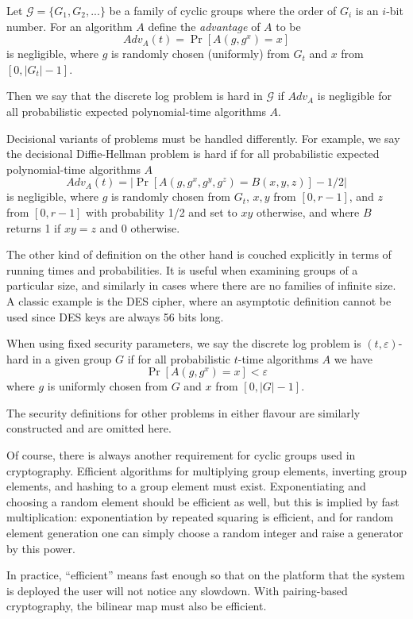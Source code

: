 Let $\mathcal G = \{G_1, G_2, ... \}$ be a family of cyclic groups
where the order of $G_i$ is an $i$-bit number.
For an algorithm $A$
define the \emph{advantage} of $A$ to be
\[
Adv_A(t) = \Pr [ A(g, g^x) = x ]
\]
is negligible,
where $g$ is randomly chosen (uniformly) from $G_t$ and $x$ from
$[0, |G_t|-1]$.

Then we say that
the discrete log problem is hard in $\mathcal G$ if $Adv_A$ is negligible
for all probabilistic expected polynomial-time algorithms $A$.

Decisional variants of problems must be handled differently.
For example, we say the decisional Diffie-Hellman problem is hard if
for all probabilistic expected polynomial-time algorithms $A$
\[
Adv_A(t) = | \Pr [ A(g, g^x, g^y, g^z) = B(x, y, z) ] - 1/2 |
\]
is negligible,
where $g$ is randomly chosen from $G_t$, $x, y$ from $[0,r-1]$, and
$z$ from $[0,r-1]$ with probability 1/2 and set to $x y$ otherwise,
and where $B$ returns 1 if $x y = z$ and 0 otherwise.

The other kind of definition on the other hand is couched explicitly in
terms of running times and probabilities. It is useful when examining
groups of a particular size, and similarly in cases where there are no
families of infinite size. A classic example is the DES cipher, where
an asymptotic definition cannot be used
since DES keys are always 56 bits long.

When using fixed security parameters, we say the discrete
log problem is $(t, \varepsilon)$-hard in a given
group $G$ if for all probabilistic $t$-time algorithms $A$ we have
\[ \Pr [ A(g, g^x) = x ] < \varepsilon \]
where $g$ is uniformly chosen from $G$ and $x$ from $[0, |G| -1]$.

The security definitions for other problems in either flavour
are similarly constructed and are omitted here.

Of course, there is always another requirement for cyclic groups
used in cryptography.
Efficient algorithms for multiplying group elements, inverting group elements,
and hashing to a group element must exist.
Exponentiating and choosing a random element should be efficient as well,
but this is implied by fast multiplication: exponentiation by
repeated squaring is efficient, and for random element generation
one can simply choose
a random integer and raise a generator by this power.

In practice, ``efficient''
means fast enough so that on the platform that the system is deployed
the user will not notice any slowdown. With pairing-based cryptography,
the bilinear map must also be efficient.


